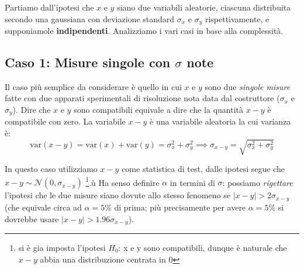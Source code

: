 \documentclass[openany,a4paper,12pt]{book}
\theoremstyle{remark}
\begin{document}
Partiamo dall'ipotesi che $x$ e $y$ siano due variabili aleatorie, ciascuna distribuita secondo una gaussiana con deviazione standard $\sigma_x$ e $\sigma_y$ rispettivamente, e supponiamole \textbf{indipendenti}. Analizziamo i vari casi in base alla complessità.

\subsection*{Caso 1: Misure singole con $\sigma$ note}
Il caso più semplice da considerare è quello in cui $x$ e $y$ sono due \textit{singole misure} fatte con due apparati sperimentali di risoluzione nota data dal costruttore ($\sigma_x$ e $\sigma_y$). 
Dire che $x$ e $y$ sono compatibili equivale a dire che la quantità $x-y$ è compatibile con zero.
La variabile $x-y$ è una variabile aleatoria la cui varianza è:
\begin{equation}
    \text{var}(x-y) = \text{var}(x) + \text{var}(y) = \sigma_x^2 + \sigma_y^2 \implies \sigma_{x-y} = \sqrt{\sigma_x^2 + \sigma_y^2}
\end{equation}

In questo caso utilizziamo $x-y$ come statistica di test, dalle ipotesi segue che $x-y \sim \mathcal{N}(0, \sigma_{x-y})$ 
\footnote{si è gia imposta l'ipotesi $H_0$: x e y sono compatibili, dunque è naturale che $x-y$ abbia una distribuzione centrata in 0}.ù
Ha senso definire $\alpha$ in termini di $\sigma$: possiamo \textit{rigettare} l'ipotesi che le due misure siano dovute allo stesso fenomeno se $|x-y| > 2\sigma_{x-y}$ (che equivale circa ad $\alpha=5\%$ di prima; più precisamente per avere $\alpha=5\%$ si dovrebbe usare $|x-y| > 1.96\sigma_{x-y}$).

\begin{center}
\end{center}
\end{document}
